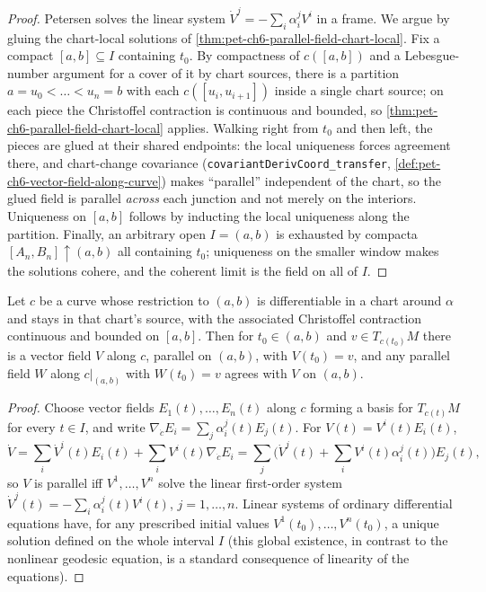 \begin{proof}
  \leanok
  Petersen solves the linear system $\dot V^j=-\sum_i\alpha^j_iV^i$ in a frame.
  We argue by gluing the chart-local solutions of
  \cref{thm:pet-ch6-parallel-field-chart-local}. Fix a compact
  $[a,b]\subseteq I$ containing $t_0$. By compactness of $c([a,b])$ and a
  Lebesgue-number argument for a cover of it by chart sources, there is a
  partition $a=u_0<\dots<u_n=b$ with each $c([u_i,u_{i+1}])$ inside a single
  chart source; on each piece the Christoffel contraction is continuous and
  bounded, so \cref{thm:pet-ch6-parallel-field-chart-local} applies. Walking
  right from $t_0$ and then left, the pieces are glued at their shared
  endpoints: the local uniqueness forces agreement there, and chart-change
  covariance (\texttt{covariantDerivCoord\_transfer},
  \cref{def:pet-ch6-vector-field-along-curve}) makes ``parallel'' independent of
  the chart, so the glued field is parallel \emph{across} each junction and not
  merely on the interiors. Uniqueness on $[a,b]$ follows by inducting the local
  uniqueness along the partition. Finally, an arbitrary open $I=(a,b)$ is
  exhausted by compacta $[A_n,B_n]\uparrow(a,b)$ all containing $t_0$; uniqueness
  on the smaller window makes the solutions cohere, and the coherent limit is the
  field on all of $I$.
\end{proof}

\begin{theorem}
  \label{thm:pet-ch6-parallel-field-chart-local}
  \leanok
  Let $c$ be a curve whose restriction to $(a,b)$ is differentiable in a chart
  around $\alpha$ and stays in that chart's source, with the associated
  Christoffel contraction continuous and bounded on $[a,b]$. Then for $t_0\in(a,b)$
  and $v\in T_{c(t_0)}M$ there is a vector field $V$ along $c$, parallel on
  $(a,b)$, with $V(t_0)=v$, and any parallel field $W$ along $c|_{(a,b)}$ with
  $W(t_0)=v$ agrees with $V$ on $(a,b)$.
\end{theorem}
\begin{proof}
  Choose vector fields $E_1(t),\dots,E_n(t)$ along $c$ forming a basis for
  $T_{c(t)}M$ for every $t\in I$, and write $\nabla_{\dot c}E_i=\sum_j
  \alpha_i^j(t)E_j(t)$. For $V(t)=V^i(t)E_i(t)$,
  \[
    \dot V=\sum_i\dot V^i(t)E_i(t)+\sum_iV^i(t)\nabla_{\dot c}E_i
    =\sum_j\Big(\dot V^j(t)+\sum_iV^i(t)\alpha_i^j(t)\Big)E_j(t),
  \]
  so $V$ is parallel iff $V^1,\dots,V^n$ solve the linear first-order system
  $\dot V^j(t)=-\sum_i\alpha_i^j(t)V^i(t)$, $j=1,\dots,n$. Linear systems of
  ordinary differential equations have, for any prescribed initial values
  $V^1(t_0),\dots,V^n(t_0)$, a unique solution defined on the whole interval
  $I$ (this global existence, in contrast to the nonlinear geodesic equation,
  is a standard consequence of linearity of the equations).
\end{proof}

